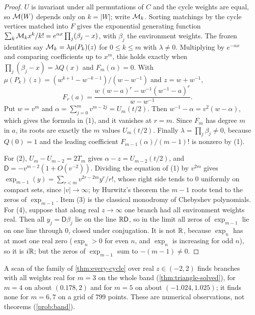\begin{proof}
$U$ is invariant under all permutations of $C$ and the cycle weights are equal, so $\mathcal{M}(W)$ depends only on $k=|W|$; write $\mathcal{M}_k$. Sorting matchings by the cycle vertices matched into $F$ gives the exponential generating function $\sum_k\mathcal{M}_kx^{k}/k!=e^{\alpha x}\prod_j(\beta_j-x)$, with $\beta_j$ the environment weights. The frozen identities say $\mathcal{M}_k=\lambda\mu(P_k)(z)$ for $0\le k\le m$ with $\lambda\neq0$. Multiplying by $e^{-\alpha x}$ and comparing coefficients up to $x^m$, this holds exactly when $\prod_j(\beta_j-x)=\lambda Q(x)$ and $F_m(\alpha)=0$. With $\mu(P_k)(z)=(w^{k+1}-w^{-k-1})/(w-w^{-1})$ and $z=w+w^{-1}$,
\[
F_r(a)=\frac{w\,(w-a)^{r}-w^{-1}(w^{-1}-a)^{r}}{w-w^{-1}}.
\]
Put $w=v^{m}$ and $\alpha=\sum_{j=0}^{m}v^{m-2j}=U_m(t/2)$. Then $w^{-1}-\alpha=v^{2}(w-\alpha)$, which gives the formula in (1), and it vanishes at $r=m$. Since $F_m$ has degree $m$ in $a$, its roots are exactly the $m$ values $U_m(t/2)$. Finally $\lambda=\prod_j\beta_j\neq0$, because $Q(0)=1$ and the leading coefficient $F_{m-1}(\alpha)/(m-1)!$ is nonzero by (1).

For (2), $U_m-U_{m-2}=2T_m$ gives $\alpha-z=U_{m-2}(t/2)$, and $\mathsf D=-v^{m-2}(1+O(v^{-2}))$. Dividing the equation of (1) by $v^{2m}$ gives $\exp_{m-1}(y)=\sum_{r<m}v^{2r-2m}y^{r}/r!$, whose right side tends to $0$ uniformly on compact sets, since $|v|\to\infty$; by Hurwitz's theorem the $m-1$ roots tend to the zeros of $\exp_{m-1}$. Item (3) is the classical monodromy of Chebyshev polynomials. For (4), suppose that along real $z\to\infty$ one branch had all environment weights real. Then all $y_j=\mathsf D\beta_j$ lie on the line $\mathbb{R}\mathsf D$, so in the limit all zeros of $\exp_{m-1}$ lie on one line through $0$, closed under conjugation. It is not $\mathbb{R}$, because $\exp_n$ has at most one real zero ($\exp_n>0$ for even $n$, and $\exp_n$ is increasing for odd $n$), so it is $i\mathbb{R}$; but the zeros of $\exp_{m-1}$ sum to $-(m-1)\neq0$.
\end{proof}

\begin{remark*}
A scan of the family of \cref{thm:every-cycle} over real $z\in(-2,2)$ finds branches with all weights real for $m=3$ on the whole band (\cref{thm:triangle-solved}), for $m=4$ on about $(0.178,2)$ and for $m=5$ on about $(-1.024,1.025)$; it finds none for $m=6,7$ on a grid of $799$ points. These are numerical observations, not theorems (\cref{prob:band}).
\end{remark*}

